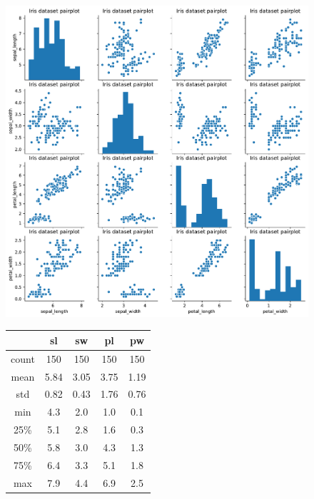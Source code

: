 \documentclass[11pt]{scrartcl}
\begin{document}
\begin{figure}[H]
	\begin{minipage}{0.9\linewidth}
		\begin{minipage}[b]{0.5\linewidth}
		  \centering
		  \includegraphics[width= \linewidth]{fig/iris_pairplot.pdf}
		  \label{iris_des}
		\end{minipage}
		\hfill
		\begin{minipage}[b]{0.4\linewidth}
		  \centering
			\begin{tabular}{c|cccc}
				\hline
				 & sl & sw & pl & pw \\
				\hline
				count & 150 & 150 & 150 & 150\\
				mean & 5.84 & 3.05 & 3.75 & 1.19\\
				std & 0.82 & 0.43 & 1.76 & 0.76\\
				min & 4.3 & 2.0 & 1.0 & 0.1 \\
				25\% & 5.1 & 2.8 & 1.6 & 0.3\\
				50\% & 5.8 & 3.0 & 4.3 & 1.3\\
				75\% & 6.4 & 3.3 & 5.1 & 1.8 \\
				max & 7.9 & 4.4  & 6.9 & 2.5 \\
				\hline
			\end{tabular} 
			
		\label{iris_table}
	\end{minipage}
\end{minipage}

\end{figure}
\end{document}
